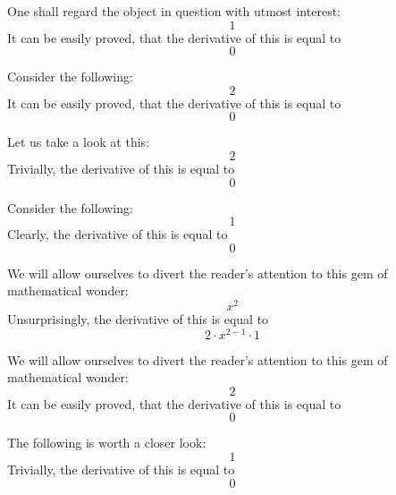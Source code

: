 \documentclass{article}
\begin{document}
One shall regard the object in question with utmost interest:
\begin{equation}
1 
\end{equation}
It can be easily proved, that the derivative of this is equal to
\begin{equation}
0 
\end{equation}

Consider the following:
\begin{equation}
2 
\end{equation}
It can be easily proved, that the derivative of this is equal to
\begin{equation}
0 
\end{equation}

Let us take a look at this:
\begin{equation}
2 
\end{equation}
Trivially, the derivative of this is equal to
\begin{equation}
0 
\end{equation}

Consider the following:
\begin{equation}
1 
\end{equation}
Clearly, the derivative of this is equal to
\begin{equation}
0 
\end{equation}

We will allow ourselves to divert the reader's attention to this gem of mathematical wonder:
\begin{equation}
x ^{2 } 
\end{equation}
Unsurprisingly, the derivative of this is equal to
\begin{equation}
2 \cdot x ^{2 - 1 } \cdot 1 
\end{equation}

We will allow ourselves to divert the reader's attention to this gem of mathematical wonder:
\begin{equation}
2 
\end{equation}
It can be easily proved, that the derivative of this is equal to
\begin{equation}
0 
\end{equation}

The following is worth a closer look:
\begin{equation}
1 
\end{equation}
Trivially, the derivative of this is equal to
\begin{equation}
0 
\end{equation}
\end{document}
